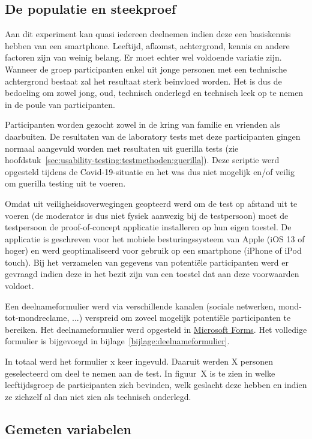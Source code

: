 \subsection{De populatie en steekproef}
\label{sec:experiment:populatie-steekproef}

Aan dit experiment kan quasi iedereen deelnemen indien deze een basiskennis hebben van een smartphone. Leeftijd, afkomst, achtergrond, kennis en andere factoren zijn van weinig belang. Er moet echter wel voldoende variatie zijn. Wanneer de groep participanten enkel uit jonge personen met een technische achtergrond bestaat zal het resultaat sterk beïnvloed worden. Het is dus de bedoeling om zowel jong, oud, technisch onderlegd en technisch leek op te nemen in de poule van participanten.

Participanten worden gezocht zowel in de kring van familie en vrienden als daarbuiten. De resultaten van de laboratory tests met deze participanten gingen normaal aangevuld worden met resultaten uit guerilla tests (zie hoofdstuk~\ref{sec:usability-testing:testmethoden:guerilla}). Deze scriptie werd opgesteld tijdens de Covid-19-situatie en het was dus niet mogelijk en/of veilig om guerilla testing uit te voeren.

Omdat uit veiligheidsoverwegingen geopteerd werd om de test op afstand uit te voeren (de moderator is dus niet fysiek aanwezig bij de testpersoon) moet de testpersoon de proof-of-concept applicatie installeren op hun eigen toestel. De applicatie is geschreven voor het mobiele besturingssysteem van Apple (iOS 13 of hoger) en werd geoptimaliseerd voor gebruik op een smartphone (iPhone of iPod touch). Bij het verzamelen van gegevens van potentiële participanten werd er gevraagd indien deze in het bezit zijn van een toestel dat aan deze voorwaarden voldoet.

Een deelnameformulier werd via verschillende kanalen (sociale netwerken, mond-tot-mondreclame, ...) verspreid om zoveel mogelijk potentiële participanten te bereiken. Het deelnameformulier werd opgesteld in \href{https://forms.office.com/}{Microsoft Forms}. Het volledige formulier is bijgevoegd in bijlage~\ref{bijlage:deelnameformulier}.

In totaal werd het formulier x keer ingevuld. Daaruit werden X personen geselecteerd om deel te nemen aan de test. In figuur~X is te zien in welke leeftijdsgroep de participanten zich bevinden, welk geslacht deze hebben en indien ze zichzelf al dan niet zien als technisch onderlegd.

\subsection{Gemeten variabelen}
\label{sec:experiment:variabelen}

